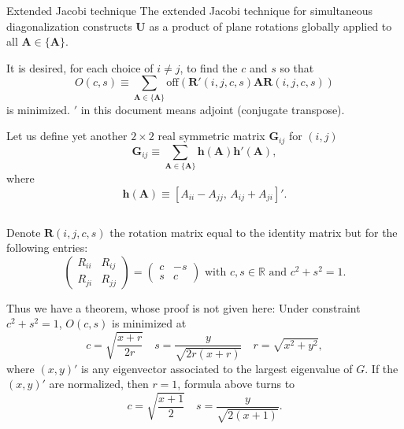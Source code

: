 \documentclass[aspectratio=169,10pt]{beamer}
\begin{document}
         \begin{frame}[allowframebreaks]{Extended Jacobi technique} 
    The extended Jacobi technique for simultaneous diagonalization
constructs \(\mathbf{U}\) as a product of plane rotations globally applied to all
\(\mathbf{A}\in\{\mathbf{A}\}\).

    It is desired, for each choice of \(i\neq j\), to find the \(c\) and
\(s\) so that \[
O(c,s)\equiv\sum_{\mathbf{A}\in\{\mathbf{A}\}}\mathrm{off}(\mathbf{R}'(i,j,c,s)\mathbf{A}\mathbf{R}(i,j,c,s))
\] is minimized.
$'$ in this document means adjoint (conjugate transpose). 

    Let us define yet another \(2\times 2\) real symmetric matrix \(\mathbf{G}_{ij}\) for
\((i,j)\) \begin{equation}
\mathbf{G}_{ij}\equiv \sum_{\mathbf{A}\in\{\mathbf{A}\}}\mathbf{h}(\mathbf{A})\mathbf{h}'(\mathbf{A}),
\end{equation}
    where \begin{equation}
\mathbf{h}(\mathbf{A})\equiv[A_{ii}-A_{jj},\, A_{ij}+A_{ji}]'.
\end{equation}

\framebreak

\inputminted[linenos,firstline=39, lastline=50, breaklines]{cpp}{../simultaneousDiagonalization.cc}

\framebreak
            
    Denote \(\mathbf{R}(i,j,c,s)\) the rotation matrix equal to the identity
matrix but for the following entries: 
\begin{equation}
    \begin{pmatrix}
R_{ii} & R_{ij} \\ R_{ji} & R_{jj}\end{pmatrix}=\begin{pmatrix}
c & -s \\ s & c
\end{pmatrix} \text{ with } c,s\in\mathbb{R}\text{ and } c^2+s^2=1.
\end{equation}

    Thus we have a theorem, whose proof is not given here: Under
constraint \(c^2+s^2=1\), \(O(c,s)\) is minimized at \[
c=\sqrt{\frac{x+r}{2r}}\quad s=\frac{y}{\sqrt{2r(x+r)}}\quad r=\sqrt{x^2+y^2},
\] where \((x, y)'\) is any eigenvector associated to the largest
eigenvalue of \(G\).  If the $(x,y)'$ are normalized, then $r =1$, formula above turns to
\begin{equation}
c=\sqrt{\frac{x+1}{2}}\quad s=\frac{y}{\sqrt{2(x+1)}}.
\end{equation}
            

\end{frame}
\end{document}
